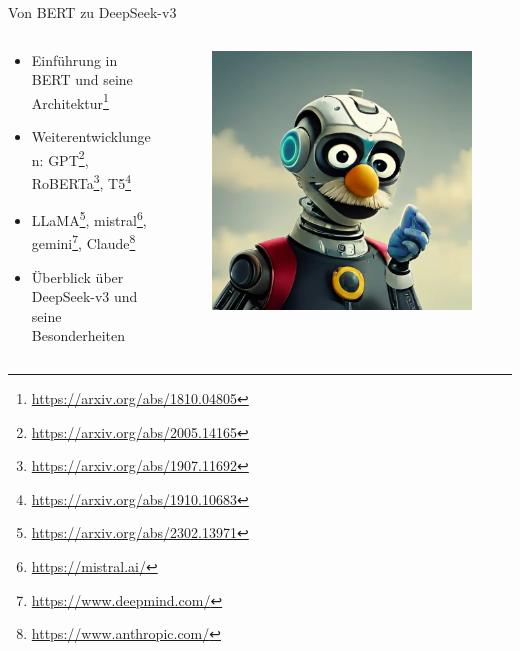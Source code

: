 \documentclass[aspectratio=1610, xcolor=dvipsnames, 9pt]{beamer}
\begin{document}
\begin{frame}{Von BERT zu DeepSeek-v3}
  \begin{columns}
    \begin{column}{0.5\textwidth}
      \begin{itemize}
        \item Einführung in BERT und seine Architektur\footnote{\url{https://arxiv.org/abs/1810.04805}} \\
        \item Weiterentwicklungen: GPT\footnote{\url{https://arxiv.org/abs/2005.14165}}, RoBERTa\footnote{\url{https://arxiv.org/abs/1907.11692}}, T5\footnote{\url{https://arxiv.org/abs/1910.10683}} \\
        \item LLaMA\footnote{\url{https://arxiv.org/abs/2302.13971}}, mistral\footnote{\url{https://mistral.ai/}}, gemini\footnote{\url{https://www.deepmind.com/}}, Claude\footnote{\url{https://www.anthropic.com/}} \\
        \item Überblick über DeepSeek-v3 und seine Besonderheiten
      \end{itemize}
    \end{column}
    \begin{column}{0.5\textwidth}
      \begin{figure}
        \centering
        \includegraphics[height=0.35\textheight]{images/mechaBERT.png}

\end{figure}
\end{column}
\end{columns}
\end{frame}
\end{document}
